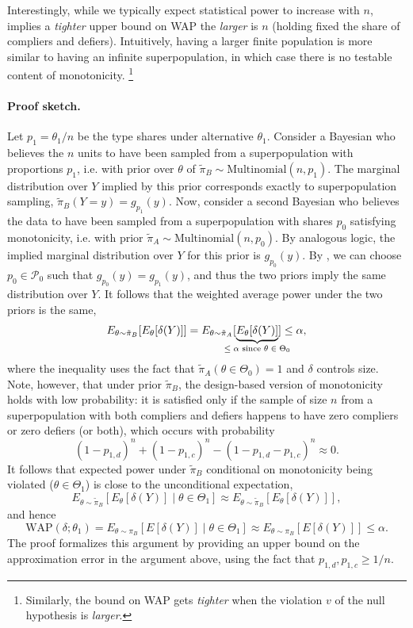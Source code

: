 \documentclass[12pt,reqno]{amsart}
\begin{document}
Interestingly, while we typically expect statistical power to increase with $n$,
 implies a \emph{tighter} upper bound on WAP the \emph{larger} is $n$
(holding fixed the share of compliers and defiers). Intuitively, having a larger finite
population is more similar to having an infinite superpopulation, in which case there is
no testable content of monotonicity.%
\footnote{
Similarly, the bound on WAP gets \emph{tighter} when the violation $v$ of the null hypothesis is \emph{larger}.}

\paragraph{\textbf{Proof sketch.}} Let $p_1 = \theta_1/n$ be the type shares under alternative $\theta_1$. Consider a Bayesian who believes the $n$ units to have been sampled from a superpopulation with proportions $p_1$, i.e. with prior over $\theta$ of $\tilde\pi_B \sim \mathrm{Multinomial}(n,p_1)$. The marginal distribution over $Y$ implied by this prior corresponds exactly to superpopulation sampling, $\tilde\pi_B(Y{=}y) = g_{p_1}(y)$. Now, consider a second Bayesian who believes the data to have been sampled from a superpopulation with shares $p_0$ satisfying monotonicity, i.e. with prior $\tilde\pi_A \sim \mathrm{Multinomial}(n,p_0)$. By analogous logic, the implied marginal distribution over $Y$ for this prior is $g_{p_0}(y)$. By , we can choose $p_0 \in \mathcal{P}_0$ such that $g_{p_0}(y) = g_{p_1}(y)$, and thus the two priors imply the same distribution over $Y$. It follows that the weighted average power under the two priors is the same,
\[E_{\theta \sim \tilde\pi_B}[ E_\theta[\delta(Y)] ] = E_{\theta \sim \tilde\pi_A}[ \underbrace{E_\theta[\delta(Y)] }_{\mathclap{\text{$\leq \alpha$ since $\theta \in \Theta_0$}}}] \leq \alpha, \]
where the inequality uses the fact that $\tilde\pi_A(\theta \in \Theta_0) = 1$ and $\delta$ controls size. Note, however, that under prior $\tilde\pi_B$, the design-based version of monotonicity holds with low probability: it is satisfied only if the sample of size $n$ from a superpopulation with both compliers and defiers happens to have zero compliers or zero defiers (or both), which occurs with probability \[(1-p_{1,d})^n + (1-p_{1,c})^n - (1-p_{1,d}-p_{1,c})^n \approx 0.\]  It follows that expected power under $\tilde\pi_B$ conditional on monotonicity being violated ($\theta \in \Theta_1$) is close to the unconditional expectation,
\[E_{\theta \sim \tilde\pi_B}[ E_\theta[\delta(Y)] \mid \theta \in \Theta_1 ] \approx E_{\theta \sim \tilde\pi_B}[ E_\theta[\delta(Y)] ] , \] and hence
$$ \mathrm{WAP}(\delta; \theta_1) = E_{\theta \sim \pi_B}[ E[\delta(Y)] \mid \theta \in \Theta_1 ] \approx  E_{\theta \sim \pi_B}[ E[\delta(Y)]  ]  \leq \alpha. $$
The proof formalizes this argument by providing an upper bound on the approximation error in the argument above, using the fact that $p_{1,d},p_{1,c} \geq 1/n$.
\end{document}
